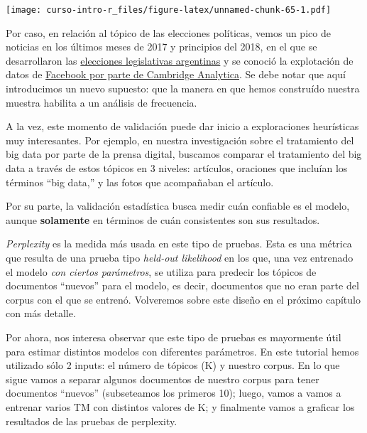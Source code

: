 \documentclass[
]{book}
\begin{document}
\texttt{[image: curso-intro-r\_files/figure-latex/unnamed-chunk-65-1.pdf]}

Por caso, en relación al tópico de las elecciones políticas, vemos un pico de noticias en los últimos meses de 2017 y principios del 2018, en el que se desarrollaron las \href{https://es.wikipedia.org/wiki/Elecciones_legislativas_de_Argentina_de_2017}{elecciones legislativas argentinas} y se conoció la explotación de datos de \href{https://es.wikipedia.org/wiki/Cambridge_Analytica\#Campa\%C3\%B1a_de_Mauricio_Macri}{Facebook por parte de Cambridge Analytica}. Se debe notar que aquí introducimos un nuevo supuesto: que la manera en que hemos construído nuestra muestra habilita a un análisis de frecuencia.

A la vez, este momento de validación puede dar inicio a exploraciones heurísticas muy interesantes. Por ejemplo, en nuestra investigación sobre el tratamiento del big data por parte de la prensa digital, buscamos comparar el tratamiento del big data a través de estos tópicos en 3 niveles: artículos, oraciones que incluían los términos ``big data,'' y las fotos que acompañaban el artículo.

Por su parte, la validación estadística busca medir cuán confiable es el modelo, aunque \textbf{solamente} en términos de cuán consistentes son sus resultados.

\emph{Perplexity} es la medida más usada en este tipo de pruebas. Esta es una métrica que resulta de una prueba tipo \emph{held-out likelihood} en los que, una vez entrenado el modelo \emph{con ciertos parámetros}, se utiliza para predecir los tópicos de documentos ``nuevos'' para el modelo, es decir, documentos que no eran parte del corpus con el que se entrenó. Volveremos sobre este diseño en el próximo capítulo con más detalle.

Por ahora, nos interesa observar que este tipo de pruebas es mayormente útil para estimar distintos modelos con diferentes parámetros. En este tutorial hemos utilizado sólo 2 inputs: el número de tópicos (K) y nuestro corpus.
En lo que sigue vamos a separar algunos documentos de nuestro corpus para tener documentos ``nuevos'' (subseteamos los primeros 10); luego, vamos a vamos a entrenar varios TM con distintos valores de K; y finalmente vamos a graficar los resultados de las pruebas de perplexity.
\end{document}
